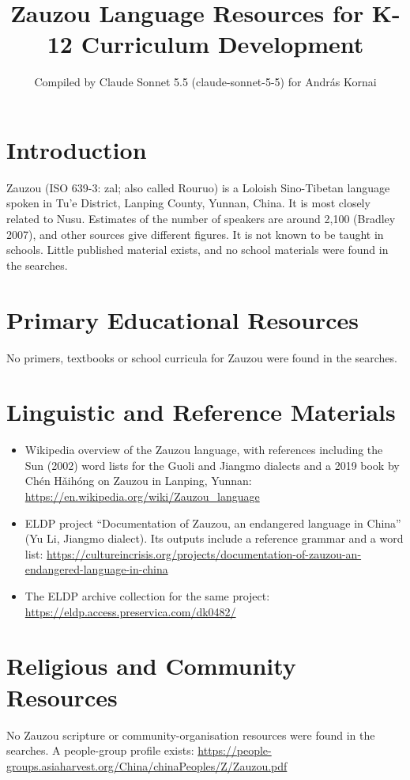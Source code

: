\documentclass[12pt]{article}
\title{Zauzou Language Resources for K-12 Curriculum Development}
\author{Compiled by Claude Sonnet 5.5 (claude-sonnet-5-5) for Andr\'as Kornai}
\date{}
\begin{document}
\maketitle

\section{Introduction}
Zauzou (ISO 639-3: zal; also called Rouruo) is a Loloish Sino-Tibetan language spoken in Tu'e District, Lanping County, Yunnan, China. It is most closely related to Nusu. Estimates of the number of speakers are around 2,100 (Bradley 2007), and other sources give different figures. It is not known to be taught in schools. Little published material exists, and no school materials were found in the searches.

\section{Primary Educational Resources}
No primers, textbooks or school curricula for Zauzou were found in the searches.

\section{Linguistic and Reference Materials}
\begin{itemize}
\item Wikipedia overview of the Zauzou language, with references including the Sun (2002) word lists for the Guoli and Jiangmo dialects and a 2019 book by Ch\'en H\v{a}ih\'ong on Zauzou in Lanping, Yunnan: \url{https://en.wikipedia.org/wiki/Zauzou_language}
\item ELDP project ``Documentation of Zauzou, an endangered language in China'' (Yu Li, Jiangmo dialect). Its outputs include a reference grammar and a word list: \url{https://cultureincrisis.org/projects/documentation-of-zauzou-an-endangered-language-in-china}
\item The ELDP archive collection for the same project: \url{https://eldp.access.preservica.com/dk0482/}
\end{itemize}

\section{Religious and Community Resources}
No Zauzou scripture or community-organisation resources were found in the searches. A people-group profile exists: \url{https://people-groups.asiaharvest.org/China/chinaPeoples/Z/Zauzou.pdf}
\end{document}
